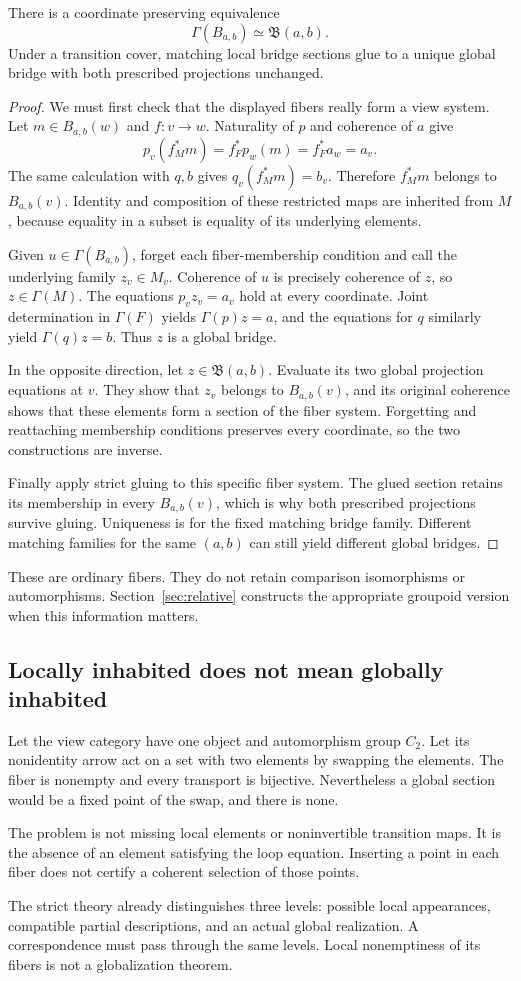 \begin{theorem}\label{KS06}
There is a coordinate preserving equivalence
\[
 \Gamma(B_{a,b})\simeq\mathfrak B(a,b).
\]
Under a transition cover, matching local bridge sections glue to a unique global bridge with both prescribed projections unchanged.
\end{theorem}
\begin{proof}
We must first check that the displayed fibers really form a view system. Let $m\in B_{a,b}(w)$ and $f:v\to w$. Naturality of $p$ and coherence of $a$ give
\[
 p_v(f_M^*m)=f_F^*p_w(m)=f_F^*a_w=a_v.
\]
The same calculation with $q,b$ gives $q_v(f_M^*m)=b_v$. Therefore $f_M^*m$ belongs to $B_{a,b}(v)$. Identity and composition of these restricted maps are inherited from $M$, because equality in a subset is equality of its underlying elements.

Given $u\in\Gamma(B_{a,b})$, forget each fiber-membership condition and call the underlying family $z_v\in M_v$. Coherence of $u$ is precisely coherence of $z$, so $z\in\Gamma(M)$. The equations $p_vz_v=a_v$ hold at every coordinate. Joint determination in $\Gamma(F)$ yields $\Gamma(p)z=a$, and the equations for $q$ similarly yield $\Gamma(q)z=b$. Thus $z$ is a global bridge.

In the opposite direction, let $z\in\mathfrak B(a,b)$. Evaluate its two global projection equations at $v$. They show that $z_v$ belongs to $B_{a,b}(v)$, and its original coherence shows that these elements form a section of the fiber system. Forgetting and reattaching membership conditions preserves every coordinate, so the two constructions are inverse.

Finally apply strict gluing to this specific fiber system. The glued section retains its membership in every $B_{a,b}(v)$, which is why both prescribed projections survive gluing. Uniqueness is for the fixed matching bridge family. Different matching families for the same $(a,b)$ can still yield different global bridges.
\end{proof}
These are ordinary fibers. They do not retain comparison isomorphisms or automorphisms. Section~\ref{sec:relative} constructs the appropriate groupoid version when this information matters.

\subsection{Locally inhabited does not mean globally inhabited}
\begin{example}\label{KS07}
Let the view category have one object and automorphism group \(C_2\). Let its nonidentity arrow act on a set with two elements by swapping the elements. The fiber is nonempty and every transport is bijective. Nevertheless a global section would be a fixed point of the swap, and there is none.
\end{example}
The problem is not missing local elements or noninvertible transition maps. It is the absence of an element satisfying the loop equation. Inserting a point in each fiber does not certify a coherent selection of those points.

\begin{insight}
The strict theory already distinguishes three levels: possible local appearances, compatible partial descriptions, and an actual global realization. A correspondence must pass through the same levels. Local nonemptiness of its fibers is not a globalization theorem.
\end{insight}
